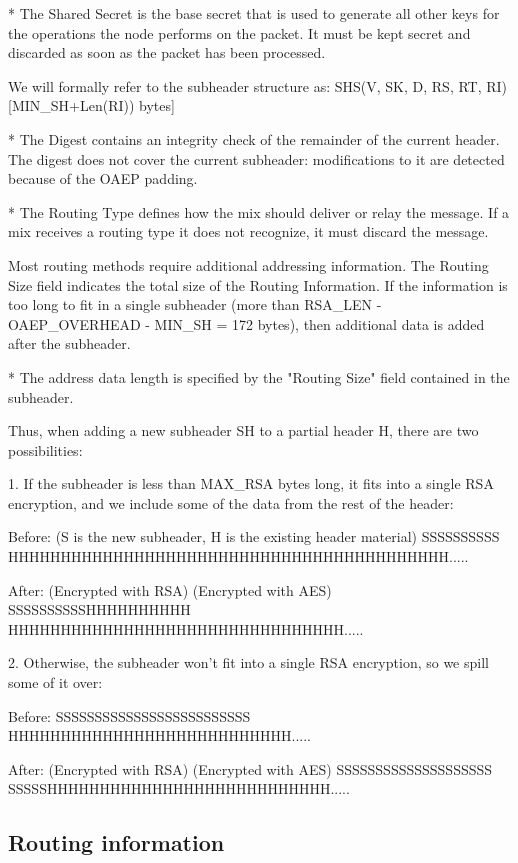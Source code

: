 * The Shared Secret is the base secret that is used to generate all
other keys for the operations the node performs on the packet. It must be
kept secret and discarded as soon as the packet has been processed. 

We will formally refer to the subheader structure as:
SHS(V, SK, D, RS, RT, RI)     [MIN_SH+Len(RI)) bytes] 

* The Digest contains an integrity check of the remainder of the
  current header. The digest does not cover the current subheader:
  modifications to it are detected because of the OAEP padding.

* The Routing Type defines how the mix should deliver or relay the
  message. If a mix receives a routing type it does not recognize,
  it must discard the message.

  Most routing methods require additional addressing information.
  The Routing Size field indicates the total size of the Routing
  Information. If the information is too long to fit in a single
  subheader (more than RSA_LEN - OAEP_OVERHEAD - MIN_SH = 172 bytes), 
  then additional data is added after the subheader.

* The address data length is specified by the "Routing Size" field
  contained in the subheader.

Thus, when adding a new subheader SH to a partial header H, there are
two possibilities:

   1. If the subheader is less than MAX_RSA bytes long, it fits into a
      single RSA encryption, and we include some of the data from the
      rest of the header:
   
     Before: (S is the new subheader, H is the existing header material)
      SSSSSSSSSS   HHHHHHHHHHHHHHHHHHHHHHHHHHHHHHHHHHHHHHHHHH.....

     After: 
      (Encrypted with RSA)   (Encrypted with AES)
      SSSSSSSSSSHHHHHHHHHH   HHHHHHHHHHHHHHHHHHHHHHHHHHHHHHHH.....

   2.  Otherwise, the subheader won't fit into a single RSA
       encryption, so we spill some of it over:

     Before:
      SSSSSSSSSSSSSSSSSSSSSSSSS   HHHHHHHHHHHHHHHHHHHHHHHHHHH.....

     After:
      (Encrypted with RSA)   (Encrypted with AES)
      SSSSSSSSSSSSSSSSSSSS   SSSSSHHHHHHHHHHHHHHHHHHHHHHHHHHH.....

\subsection{Routing information}

